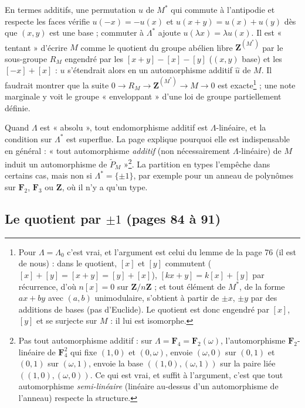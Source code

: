\documentclass[11pt,a4paper]{article}
\begin{document}
En termes additifs, une permutation $u$ de $M^{*}$ qui commute à l'antipodie et
respecte les faces vérifie $u(-x) = -u(x)$ et $u(x + y) = u(x) + u(y)$ dès que
$(x, y)$ est une base ; commuter à $\Lambda^{*}$ ajoute $u(\lambda x) = \lambda
u(x)$. Il est « tentant » d'écrire $M$ comme le quotient du groupe abélien libre
$\mathbf{Z}^{(M^{*})}$ par le sous-groupe $R_M$ engendré par les $[x + y] - [x] -
[y]$ ($(x, y)$ base) et les $[-x] + [x]$ : $u$ s'étendrait alors en un
automorphisme additif $\hat u$ de $M$. Il faudrait montrer que la suite $0 \to
R_M \to \mathbf{Z}^{(M^{*})} \to M \to 0$ est exacte\footnote{Pour $\Lambda =
\Lambda_0$ c'est vrai, et l'argument est celui du lemme de la page 76 (il est
de nous) : dans le quotient, $[x]$ et $[y]$ commutent ($[x] + [y] = [x+y] =
[y] + [x]$), $[kx + y] = k[x] + [y]$ par récurrence, d'où $n[x] = 0$ sur
$\mathbf{Z}/n\mathbf{Z}$ ; et tout élément de $M^{*}$, de la forme $ax + by$ avec
$(a, b)$ unimodulaire, s'obtient à partir de $\pm x$, $\pm y$ par des additions
de bases (pas d'Euclide). Le quotient est donc engendré par $[x]$, $[y]$ et se
surjecte sur $M$ : il lui est isomorphe.} ; une note marginale y voit le groupe
« enveloppant » d'une loi de groupe partiellement définie.

Quand $\Lambda$ est « absolu », tout endomorphisme additif est
$\Lambda$-linéaire, et la condition sur $\Lambda^{*}$ est superflue. La page
explique pourquoi elle est indispensable en général : « tout automorphisme
\emph{additif} (non nécessairement $\Lambda$-linéaire) de $M$ induit un
automorphisme de $\widetilde{P}_M$ »\footnote{Pas tout automorphisme additif :
sur $\Lambda = \mathbf{F}_4 = \mathbf{F}_2(\omega)$, l'automorphisme
$\mathbf{F}_2$-linéaire de $\mathbf{F}_4^2$ qui fixe $(1, 0)$ et $(0, \omega)$,
envoie $(\omega, 0)$ sur $(0, 1)$ et $(0, 1)$ sur $(\omega, 1)$, envoie la base
$((1, 0), (\omega, 1))$ sur la paire liée $((1, 0), (\omega, 0))$. Ce qui est
vrai, et suffit à l'argument, c'est que tout automorphisme \emph{semi-linéaire}
(linéaire au-dessus d'un automorphisme de l'anneau) respecte la structure.}.
La partition en types l'empêche dans certains cas, mais non si $\Lambda^{*} =
\{\pm 1\}$, par exemple pour un anneau de polynômes sur $\mathbf{F}_2$,
$\mathbf{F}_3$ ou $\mathbf{Z}$, où il n'y a qu'un type.

\subsection*{Le quotient par $\pm 1$ (pages 84 à 91)}
\end{document}
